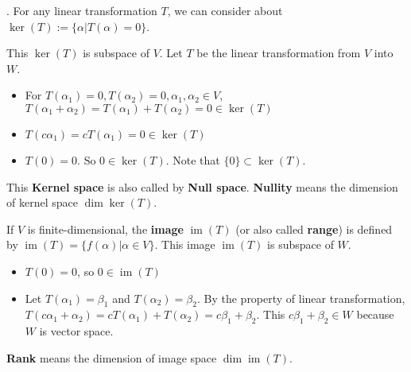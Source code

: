 \documentclass[8pt]{beamer}
\newcommand{\tb}[1]{\textbf{#1}}
\newcommand{\im}{\operatorname{im}}
\begin{document}
\begin{frame}{.}
    For any linear transformation $T$, we can consider about $\ker{(T)} := \{\alpha | T(\alpha) = 0\}$.

    This $\ker (T)$ is subspace of $V$. Let $T$ be the linear transformation from $V$ into $W$.
    \begin{itemize}
        \item For $T(\alpha_1) = 0, T(\alpha_2) =0, \alpha_1, \alpha_2 \in V$, $T(\alpha_1 + \alpha_2) = T(\alpha_1) + T(\alpha_2) = 0 \in \ker (T)$
        \item $T(c\alpha_1) = cT(\alpha_1)  = 0 \in \ker (T)$
        \item $T(0) = 0$. So $ 0 \in \ker (T)$. Note that $\{0\} \subset \ker (T)$.
    \end{itemize}

    This \tb{Kernel space} is also called by \tb{Null space}.
    \tb{Nullity} means the dimension of kernel space $\dim \ker (T)$.

    \bigskip

    If $V$ is finite-dimensional, the \tb{image}  $\im (T)$ (or also called \tb{range}) is defined by $\im (T) = \{ f(\alpha) | \alpha \in V\}$.
    This image $\im(T)$ is subspace of $W$.
    \begin{itemize}
        \item $T(0) =0$, so $0 \in \im (T)$
        \item Let $T(\alpha_1) = \beta_1$ and $T(\alpha_2) = \beta_2$. By the property of linear transformation, $T(c\alpha_1 + \alpha_2) = cT(\alpha_1) + T(\alpha_2) = c\beta_1 + \beta_2$. This $c\beta_1 +\beta_2 \in W$ because $W$ is vector space.
    \end{itemize}

    \tb{Rank} means the dimension of image space $\dim \im(T)$. 
    
\end{frame}
\end{document}
